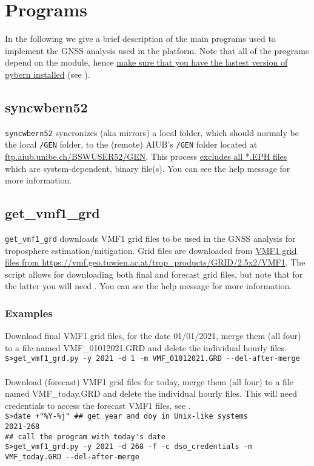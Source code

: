 \chapter{Programs}
\label{ch:programs}

In the following we give a brief description of the main programs used to 
implement the GNSS analysis used in the platform. Note that all of the programs 
depend on the  module, hence \ul{make sure that you have 
the lastest version of pybern installed} (see ).

\section{syncwbern52}
\label{sec:programs-syncwbern52}
\verb|syncwbern52| syncronizes (aka mirrors) a local folder, which should normaly 
be the local \verb|/GEN| folder, to the (remote) AIUB's \verb|/GEN| folder 
located at \url{ftp.aiub.unibe.ch/BSWUSER52/GEN}. This process 
\ul{excludes all *.EPH files} which are system-dependent, binary file(s).
You can see the help message for more information.

\section{get\_vmf1\_grd}
\label{sec:programs-get-vmf1-grd}
\verb|get_vmf1_grd| downloads VMF1 grid files to be used in the GNSS analysis 
for troposphere estimation/mitigation. Grid files are downloaded from 
\url{VMF1 grid files from https://vmf.geo.tuwien.ac.at/trop_products/GRID/2.5x2/VMF1}.
The script allows for downloading both final and forecast grid files, but note that 
for the latter you will need . You can see the 
help message for more information.


\subsection{Examples}
\label{ssec:programs-get-vmf1-grd-examples}
Download final VMF1 grid files, for the date 01/01/2021, merge them (all four) to 
a file named VMF\_01012021.GRD and delete the individual hourly files.\\
\verb|$>get_vmf1_grd.py -y 2021 -d 1 -m VMF_01012021.GRD --del-after-merge|\\
\\

Download (forecast) VMF1 grid files for today, merge them (all four) to a file 
named VMF\_today.GRD and delete the individual hourly files. This will need credentials 
to access the forecast VMF1 files, see .\\
\verb|$>date +"%Y-%j" ## get year and doy in Unix-like systems|\\
\verb|2021-268|\\
\verb|## call the program with today's date|\\
\verb|$>get_vmf1_grd.py -y 2021 -d 268 -f -c dso_credentials -m VMF_today.GRD --del-after-merge|\\